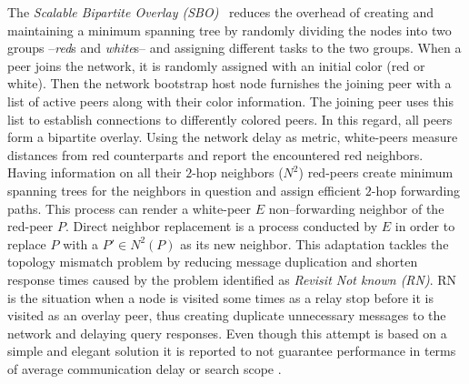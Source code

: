 The \emph{Scalable Bipartite Overlay (SBO)}~\cite{LXN2007} 
reduces the overhead of creating
and maintaining a minimum spanning tree 
by randomly dividing the nodes into
two groups --\emph{red}s and \emph{white}s-- 
and assigning different tasks to the two groups.
When a peer joins the network, it is randomly assigned with an initial
color (red or white).
Then the network bootstrap host node furnishes the joining peer with a list
of active peers along with their color information. 
The joining peer uses this list to 
establish connections to differently colored peers. 
In this regard, all peers form a bipartite overlay. 
Using the network delay as metric, white-peers 
measure distances from red counterparts
and report the encountered red neighbors.
Having information on all their $2$-hop neighbors 
($N^2$)
red-peers create minimum spanning trees for the neighbors in question and
assign efficient $2$-hop forwarding paths. This process can render a white-peer
$E$ non--forwarding neighbor of the red-peer $P$. Direct neighbor
replacement is a process conducted by $E$ in order to replace $P$ with a
$P' \in N^2(P)$ as its new neighbor. This adaptation tackles the
topology mismatch problem by reducing message duplication and shorten response
times caused by the problem identified as \emph{Revisit Not known (RN)}. RN is
the situation when a node is visited some times as a relay stop before it is
visited as an overlay peer, thus creating duplicate unnecessary messages to the
network and delaying query responses.
Even though this attempt is based on a simple and elegant solution it is
reported to not guarantee performance in terms of average communication delay
or search scope \cite{HLH2009}.
%
%
%
